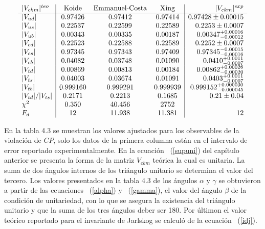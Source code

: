 {\tiny
\begin{table}[h!]\label{tra}
\caption{Valores te\'oricos obtenidos de $|V_{ij}|$ utilizando la texturas con 
cuatro ceros de Fritzsch (F4) para las matrices de masa presentadas en la tabla 
~\ref{t3masas} y los valores experimentales de $|V_{ij}|$.}
$$\ba{l|ccc|r}
|V_{ckm}|^{teo} & \mbox{Koide} & \mbox{Emmanuel-Costa} & \mbox{Xing} & 
|V_{ckm}|^{exp}\\ \hline
|V_{ud}| & 0.97426 & 0.97412 & 0.97414 & 
0.97428\pm{0.00015} \\
|V_{us}| & 0.22537 & 0.22599 & 0.22589 & 
0.2253\pm{0.0007} \\
|V_{ub}| & 0.00343 & 0.00335 & 0.00187 & 
0.00347^{+0.00016}_{-0.00012} \\
|V_{cd}| & 0.22523 & 0.22588 & 0.22589 & 
0.2252\pm{0.0007} \\
|V_{cs}| & 0.97345 & 0.97343 & 0.97409 & 
0.97345^{-0.00015}_{-0.00016} \\
|V_{cb}| & 0.04082 & 0.03748 & 0.01090 & 
0.0410^{+0.0011}_{-0.0007} \\
|V_{td}| & 0.00869 & 0.00813 & 0.00184 & 
0.00862^{+0.00026}_{-0.00020} \\
|V_{ts}| & 0.04003 & 0.03674 & 0.01091 & 
0.0403^{+0.0011}_{-0.0007} \\
|V_{tb}| & 0.999160 & 0.999291 & 0.999939 & 
0.999152^{+0.000030}_{-0.000045} \\
|V_{td}|/|V_{ts}| & 0.2171 & 0.2213 & 0.1685 & 0.21\pm{0.04} \\
\chi^2& 0.350 & 40.456 &2752 \\
F_d & 12 & 11.938 & 11.381 & 12 \\
\ea
$$\end{table} }
  
En la tabla 4.3 se muestran los valores ajustados para los observables de
la violaci\'on de $CP$, solo los datos de la primera columna est\'an en el
intervalo de error reportado experimentalmente. En la ecuaci\'on ~(\ref{supuni})
del cap\'itulo anterior se presenta la forma de la matriz $V_{ckm}$ te\'orica
la cual es unitaria. La suma de dos \'angulos internos de los tri\'angulo
unitario se determina el valor del tercero. Los valores presentados
en la tabla 4.3 de los \'angulos $\alpha$ y $\gamma$ se obtuvieron a 
partir de las ecuaciones ~(\ref{alpha}) y ~(\ref{gamma}), el valor del \'angulo
$\beta$ de la condici\'on de unitariedad, con lo que se asegura la existencia
del tri\'angulo unitario y que la suma de los tres \'angulos deber ser 180. Por
\'ultimon el valor te\'orico reportado para el invariante de Jarlskog se
calcul\'o de la ecuaci\'on ~(\ref{idj}).
 
